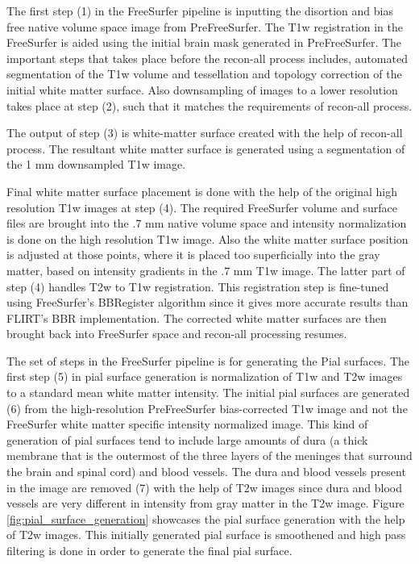 The first step (1) in the FreeSurfer pipeline is inputting the disortion and bias free native volume space image from PreFreeSurfer. The T1w registration in the FreeSurfer is aided using the initial brain mask generated in PreFreeSurfer. The important steps that takes place before the recon-all process includes, automated segmentation of the T1w volume and tessellation and topology correction of the initial white matter surface. Also downsampling of images to a lower resolution takes place at step (2), such that it matches the requirements of recon-all process.

The output of step (3) is white-matter surface created with the help of recon-all process. The resultant white matter surface is generated using a segmentation of the 1 mm downsampled T1w image.

Final white matter surface placement is done with the help of the original high resolution T1w images at step (4). The required FreeSurfer volume and surface files are brought into the .7 mm native volume space and intensity normalization is done on the high resolution T1w image. Also the white matter surface position is adjusted at those points, where it is placed too superficially into the gray matter, based on intensity gradients in the .7 mm T1w image. The latter part of step (4) handles T2w to T1w registration. This registration step is fine-tuned using FreeSurfer's BBRegister algorithm since it gives more accurate results than FLIRT's BBR implementation. The corrected white matter surfaces are then brought back into FreeSurfer space and recon-all processing resumes.

The set of steps in the FreeSurfer pipeline is for generating the Pial surfaces. The first step (5) in pial surface generation is normalization of T1w and T2w images to a standard mean white matter intensity. The initial pial surfaces are generated (6) from the high-resolution PreFreeSurfer bias-corrected T1w image and not the FreeSurfer white matter specific intensity normalized image. This kind of generation of pial surfaces tend to include large amounts of dura (a thick membrane that is the outermost of the three layers of the meninges that surround the brain and spinal cord) and blood vessels. The dura and blood vessels present in the image are removed (7) with the help of T2w images since dura and blood vessels are very different in intensity from gray matter in the T2w image. Figure \ref{fig:pial_surface_generation} showcases the pial surface generation with the help of T2w images. This initially generated pial surface is smoothened and high pass filtering is done in order to generate the final pial surface.

